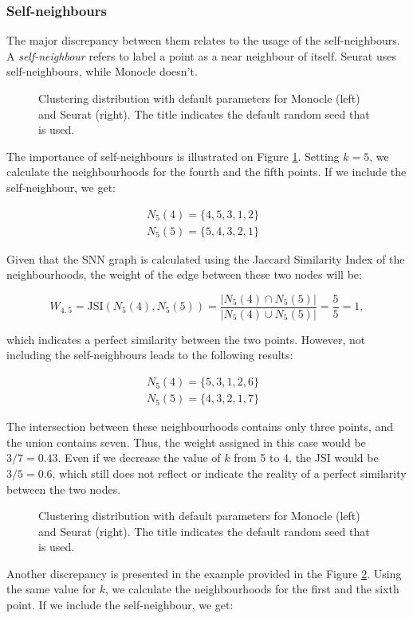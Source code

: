 \subsubsection{Self-neighbours}
The major discrepancy between them relates to the usage of the self-neighbours. A \textit{self-neighbour} refers to label a point as a near neighbour of itself. Seurat uses self-neighbours, while Monocle doesn't.
\begin{figure}[H]
    \centering
    \caption{\label{fig:s4-m3-snn-1}Clustering distribution with default parameters for Monocle (left) and Seurat (right). The title indicates the default random seed that is used.}
\end{figure}
The importance of self-neighbours is illustrated on Figure \ref{fig:s4-m3-snn-1}. Setting $k = 5$, we calculate the neighbourhoods for the fourth and the fifth points. If we include the self-neighbour, we get:

\[ \begin{aligned}
        N_5(4) = \{4,5,3,1,2\} & \\
        N_5(5) = \{5,4,3,2,1\}
    \end{aligned}
\]

Given that the SNN graph is calculated using the Jaccard Similarity Index of the neighbourhoods, the weight of the edge between these two nodes will be:

\[ W_{4,5} = \textrm{JSI}(N_5(4), N_5(5)) = \frac{|N_5(4) \cap N_5(5)|}{|N_5(4) \cup N_5(5)|} = \frac{5}{5} = 1 ,\]

which indicates a perfect similarity between the two points. However, not including the self-neighbours leads to the following results:

\[ \begin{aligned}
        N_5(4) = \{5,3,1,2,6\} & \\
        N_5(5) = \{4,3,2,1,7\}
    \end{aligned}
\]

The intersection between these neighbourhoods contains only three points, and the union contains seven. Thus, the weight assigned in this case would be $3 / 7 = 0.43$. Even if we decrease the value of $k$ from 5 to 4, the JSI would be $3 / 5 = 0.6$, which still does not reflect or indicate the reality of a perfect similarity between the two nodes.
\begin{figure}[H]
    \centering
    \caption{\label{fig:s4-m3-snn-2}Clustering distribution with default parameters for Monocle (left) and Seurat (right). The title indicates the default random seed that is used.}
\end{figure}
Another discrepancy is presented in the example provided in the Figure \ref{fig:s4-m3-snn-2}. Using the same value for $k$, we calculate the neighbourhoods for the first and the sixth point. If we include the self-neighbour, we get:

